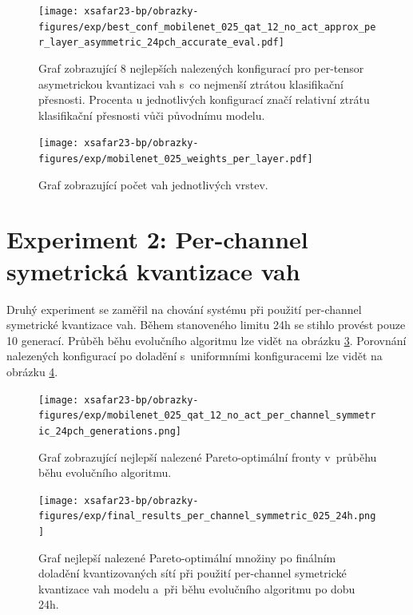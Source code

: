 \begin{figure}[H]
	\centering
	\texttt{[image: xsafar23-bp/obrazky-figures/exp/best\_conf\_mobilenet\_025\_qat\_12\_no\_act\_approx\_per\_layer\_asymmetric\_24pch\_accurate\_eval.pdf]}
	\caption{Graf zobrazující 8 nejlepších nalezených konfigurací pro per-tensor asymetrickou kvantizaci vah s~co nejmenší ztrátou klasifikační přesnosti. Procenta u jednotlivých konfigurací značí relativní ztrátu klasifikační přesnosti vůči původnímu modelu.}
	\label{fig:best_confs_per_layer}
\end{figure}

\begin{figure}[H]
	\centering
	\texttt{[image: xsafar23-bp/obrazky-figures/exp/mobilenet\_025\_weights\_per\_layer.pdf]}
	\caption{Graf zobrazující počet vah jednotlivých vrstev.}
	\label{fig:mobilenet_layers_size}
\end{figure}

\section{Experiment 2: Per-channel symetrická kvantizace vah}

Druhý experiment se zaměřil na chování systému při použití per-channel symetrické kvantizace vah. Během stanoveného limitu 24h se stihlo provést pouze 10 generací. Průběh běhu evolučního algoritmu lze vidět na obrázku \ref{fig:per_channel_symmetric_24h_generations}. Porovnání nalezených konfigurací po doladění s~uniformními konfiguracemi lze vidět na obrázku \ref{fig:per_channel_symmetric_24h}. 

\begin{figure}[H]
	\centering
	\texttt{[image: xsafar23-bp/obrazky-figures/exp/mobilenet\_025\_qat\_12\_no\_act\_per\_channel\_symmetric\_24pch\_generations.png]}
	\caption{Graf zobrazující nejlepší nalezené Pareto-optimální fronty v~průběhu běhu evolučního algoritmu.}
	\label{fig:per_channel_symmetric_24h_generations}
\end{figure}

\begin{figure}[H]
	\centering
	\texttt{[image: xsafar23-bp/obrazky-figures/exp/final\_results\_per\_channel\_symmetric\_025\_24h.png]}
	\caption{Graf nejlepší nalezené Pareto-optimální množiny po finálním doladění kvantizovaných sítí při použití per-channel symetrické kvantizace vah modelu a~při běhu evolučního algoritmu po dobu 24h.}
	\label{fig:per_channel_symmetric_24h}
\end{figure}

